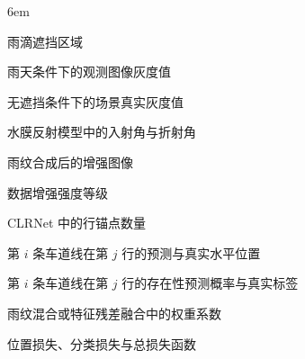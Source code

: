 
\begin{notation}

  \begin{notationlist}{6em}
    \item[$\displaystyle \Omega_r$] 雨滴遮挡区域
    \item[$\displaystyle I_{\text{obs}}$] 雨天条件下的观测图像灰度值
    \item[$\displaystyle I_{\text{scene}}$] 无遮挡条件下的场景真实灰度值
    \item[$\displaystyle \theta_i, \theta_t$] 水膜反射模型中的入射角与折射角
    \item[$\displaystyle I_{\text{syn}}$] 雨纹合成后的增强图像
    \item[$\displaystyle \gamma$] 数据增强强度等级
    \item[$\displaystyle H_r$] CLRNet 中的行锚点数量
    \item[$\displaystyle \hat{x}_{ij}, x_{ij}$] 第 $i$ 条车道线在第 $j$ 行的预测与真实水平位置
    \item[$\displaystyle \hat{y}_{ij}, y_{ij}$] 第 $i$ 条车道线在第 $j$ 行的存在性预测概率与真实标签
    \item[$\displaystyle \lambda$] 雨纹混合或特征残差融合中的权重系数
    \item[$\displaystyle \mathcal{L}_{\text{pos}}, \mathcal{L}_{\text{cls}}, \mathcal{L}_{\text{total}}$] 位置损失、分类损失与总损失函数
  \end{notationlist}

\end{notation}





